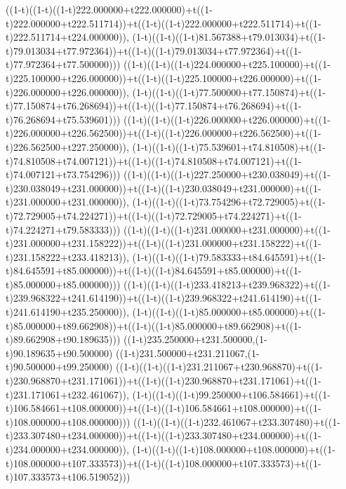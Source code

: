 ((1-t)((1-t)((1-t)222.000000+t222.000000)+t((1-t)222.000000+t222.511714))+t((1-t)((1-t)222.000000+t222.511714)+t((1-t)222.511714+t224.000000)),                                     (1-t)((1-t)((1-t)81.567388+t79.013034)+t((1-t)79.013034+t77.972364))+t((1-t)((1-t)79.013034+t77.972364)+t((1-t)77.972364+t77.500000)))
((1-t)((1-t)((1-t)224.000000+t225.100000)+t((1-t)225.100000+t226.000000))+t((1-t)((1-t)225.100000+t226.000000)+t((1-t)226.000000+t226.000000)),                                     (1-t)((1-t)((1-t)77.500000+t77.150874)+t((1-t)77.150874+t76.268694))+t((1-t)((1-t)77.150874+t76.268694)+t((1-t)76.268694+t75.539601)))
((1-t)((1-t)((1-t)226.000000+t226.000000)+t((1-t)226.000000+t226.562500))+t((1-t)((1-t)226.000000+t226.562500)+t((1-t)226.562500+t227.250000)),                                     (1-t)((1-t)((1-t)75.539601+t74.810508)+t((1-t)74.810508+t74.007121))+t((1-t)((1-t)74.810508+t74.007121)+t((1-t)74.007121+t73.754296)))
((1-t)((1-t)((1-t)227.250000+t230.038049)+t((1-t)230.038049+t231.000000))+t((1-t)((1-t)230.038049+t231.000000)+t((1-t)231.000000+t231.000000)),                                     (1-t)((1-t)((1-t)73.754296+t72.729005)+t((1-t)72.729005+t74.224271))+t((1-t)((1-t)72.729005+t74.224271)+t((1-t)74.224271+t79.583333)))
((1-t)((1-t)((1-t)231.000000+t231.000000)+t((1-t)231.000000+t231.158222))+t((1-t)((1-t)231.000000+t231.158222)+t((1-t)231.158222+t233.418213)),                                     (1-t)((1-t)((1-t)79.583333+t84.645591)+t((1-t)84.645591+t85.000000))+t((1-t)((1-t)84.645591+t85.000000)+t((1-t)85.000000+t85.000000)))
((1-t)((1-t)((1-t)233.418213+t239.968322)+t((1-t)239.968322+t241.614190))+t((1-t)((1-t)239.968322+t241.614190)+t((1-t)241.614190+t235.250000)),                                     (1-t)((1-t)((1-t)85.000000+t85.000000)+t((1-t)85.000000+t89.662908))+t((1-t)((1-t)85.000000+t89.662908)+t((1-t)89.662908+t90.189635)))
((1-t)235.250000+t231.500000,(1-t)90.189635+t90.500000)
((1-t)231.500000+t231.211067,(1-t)90.500000+t99.250000)
((1-t)((1-t)((1-t)231.211067+t230.968870)+t((1-t)230.968870+t231.171061))+t((1-t)((1-t)230.968870+t231.171061)+t((1-t)231.171061+t232.461067)),                                     (1-t)((1-t)((1-t)99.250000+t106.584661)+t((1-t)106.584661+t108.000000))+t((1-t)((1-t)106.584661+t108.000000)+t((1-t)108.000000+t108.000000)))
((1-t)((1-t)((1-t)232.461067+t233.307480)+t((1-t)233.307480+t234.000000))+t((1-t)((1-t)233.307480+t234.000000)+t((1-t)234.000000+t234.000000)),                                     (1-t)((1-t)((1-t)108.000000+t108.000000)+t((1-t)108.000000+t107.333573))+t((1-t)((1-t)108.000000+t107.333573)+t((1-t)107.333573+t106.519052)))
